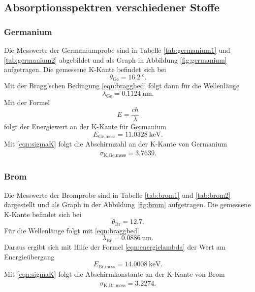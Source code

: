 \subsection{Absorptionsspektren verschiedener Stoffe}

\subsubsection{Germanium}

Die Messwerte der Germaniumprobe sind in Tabelle \ref{tab:germanium1} und
\ref{tab:germanium2} abgebildet
und als Graph in Abbildung \ref{fig:germanium} aufgetragen.
Die gemessene K-Kante befindet sich bei
\begin{equation}
  \theta_\text{Ge} = \SI{16.2}{\degree}.
\end{equation}
Mit der Bragg'schen Bedingung \eqref{eqn:braggbed} folgt dann für die
Wellenlänge
\begin{equation}
  \lambda_\text{Ge} = \SI{0.1124}{\nano\meter}.
\end{equation}
Mit der Formel
\begin{equation}
  E = \frac{c h}{\lambda}
  \label{eqn:energielambda}
\end{equation}
folgt der Energiewert an der K-Kante für Germanium
\begin{equation}
  E_\text{Ge,mess} = \SI{11.0328}{\kilo\electronvolt}.
\end{equation}
Mit \eqref{eqn:sigmaK} folgt die Abschirmzahl an der K-Kante von Germanium
\begin{align}
  \sigma_\text{K,Ge,mess} = 3.7639.
\end{align}

\subsubsection{Brom}

Die Messwerte der Bromprobe sind in Tabelle \ref{tab:brom1} und \ref{tab:brom2}
dargestellt und als
Graph in der Abbildung \ref{fig:brom} aufgetragen.
Die gemessene K-Kante befindet sich bei
\begin{equation}
  \theta_\text{Br} = 12.7 .
\end{equation}
Für die Wellenlänge folgt mit \eqref{eqn:braggbed}
\begin{equation}
  \lambda_\text{Br} = \SI{0.0886}{\nano\meter}.
\end{equation}
Daraus ergibt sich mit Hilfe der Formel \eqref{eqn:energielambda}
der Wert am Energieübergang
\begin{equation}
  E_\text{Br,mess} = \SI{14.0008}{\kilo\electronvolt}.
\end{equation}
Mit \eqref{eqn:sigmaK} folgt die Abschirmkonstante an der K-Kante von Brom
\begin{align}
  \sigma_\text{K,Br,mess} = 3.2274.
\end{align}

